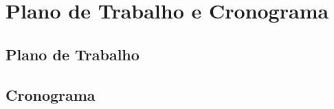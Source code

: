\chapter{Plano de Trabalho e Cronograma}
\label{ch:plano_de_trabalho_e_cronograma}


\section{Plano de Trabalho}
\label{sec:plano_de_trabalho}


\section{Cronograma}
\label{sec:cronograma}

